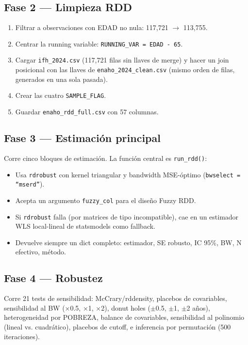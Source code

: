 \documentclass[12pt, a4paper]{article}
\begin{document}
\subsection{Fase 2 — Limpieza RDD}

\begin{enumerate}[noitemsep]
  \item Filtrar a observaciones con EDAD no nula: 117{,}721 $\to$ 113{,}755.
  \item Centrar la running variable: \texttt{RUNNING\_VAR = EDAD - 65}.
  \item Cargar \texttt{ifh\_2024.csv} (117{,}721 filas sin llaves de merge)
    y hacer un join posicional con las llaves de \texttt{enaho\_2024\_clean.csv}
    (mismo orden de filas, generados en una sola pasada).
  \item Crear las cuatro \texttt{SAMPLE\_FLAG}.
  \item Guardar \texttt{enaho\_rdd\_full.csv} con 57 columnas.
\end{enumerate}

\subsection{Fase 3 — Estimación principal}

Corre cinco bloques de estimación. La función central es \texttt{run\_rdd()}:
\begin{itemize}[noitemsep]
  \item Usa \texttt{rdrobust} con kernel triangular y bandwidth MSE-óptimo
    (\texttt{bwselect = ``mserd''}).
  \item Acepta un argumento \texttt{fuzzy\_col} para el diseño Fuzzy RDD.
  \item Si \texttt{rdrobust} falla (por matrices de tipo incompatible), cae
    en un estimador WLS local-lineal de statsmodels como fallback.
  \item Devuelve siempre un dict completo: estimador, SE robusto, IC 95\%,
    BW, N efectivo, método.
\end{itemize}

\subsection{Fase 4 — Robustez}

Corre 21 tests de sensibilidad: McCrary/rddensity, placebos de covariables,
sensibilidad al BW (×0.5, ×1, ×2), donut holes ($\pm$0.5, $\pm$1, $\pm$2
años), heterogeneidad por POBREZA, balance de covariables, sensibilidad al
polinomio (lineal vs. cuadrático), placebos de cutoff, e inferencia por
permutación (500 iteraciones).
\end{document}
